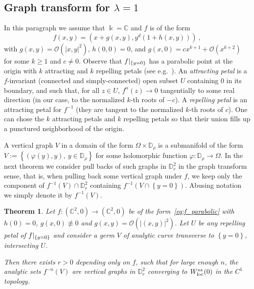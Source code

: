 \documentclass[11 pt, oneside, a4paper]{amsart}
\newcommand{\C}{\mathbb{C}}
\newcommand{\D}{\mathbb{D}}
\newcommand{\loc}{\mathrm{loc}}
\newcommand{\set}[1]{{\left\{#1\right\}}}
\newcommand{\nk}{\Bbbk}
\newcommand{\rest}[1]{ \arrowvert_{#1}}
\newcommand{\inv}{^{-1}}
\newtheorem{thm}{Theorem}[section]
\theoremstyle{definition}
\theoremstyle{definition}
\begin{document}
\subsection{Graph transform   for $\lambda=1$}
In this paragraph we assume that $\nk = \C$ and $f$ is of the form 
\begin{equation}\label{eq:f_parabolic} 
f(x,y) =  \left(x + g(x,y) , y^d(1+h(x,y))\right)~,
\end{equation}
with $g(x,y) = \mathcal{O}(|x,y|^2)$, $h(0,0) = 0$, and $g(x,0) = c x^{k+1} + \mathcal{O}(x^{k+2})$
 for some $k\geq 1$ and $c\neq 0$. Observe that $f\rest{\set{y=0}}$ has a parabolic point at the origin with $k$ attracting and $k$ repelling petals  (see e.g.~\cite[\S 6.5]{beardon:iterratfunction}).
An \emph{attracting petal} is a $f$-invariant (connected and simply-connected) open subset $U$ containing $0$ in its boundary, and such that, for all $z \in U$, $f^n(z) \to 0$
tangentially to some real direction (in our case, to the normalized $k$-th roots of $-c$). A \emph{repelling petal} is an attracting petal for $f^{-1}$ (they are tangent to the normalized $k$-th roots of $c$). One can chose the $k$ attracting petals and $k$ repelling petals so that their union fills up a punctured neighborhood of the origin. 
 

A vertical graph $V$ in a domain of the form $\Omega\times \D_\rho$
 is a  
 submanifold of the 
form $V:= \set{(\varphi(y), y), \ y\in  \D_\rho}$ for some holomorphic function 
$\varphi : \D_\rho \to \Omega$.
In the next theorem we consider 
pull backs of such graphs in $\D_r^2$ in 
 the graph transform sense, that is, 
when pulling back some vertical graph under $f$, we keep only the component of $f\inv (V)\cap \D_r^2$
containing $f\inv(V\cap \set{y=0})$. Abusing notation we simply denote it by $f\inv (V)$. 

\begin{thm}\label{thm:graph_transform_parabolic} 
Let $f\colon(\C^2, 0) \to (\C^2, 0)$ 
  be of the form~\eqref{eq:f_parabolic} 
  with $h(0)=0$, $g(x,0)\not\equiv 0$ and $g(x,y) = \mathcal{O}(|(x,y)|^2)$. 
Let $U$ be any repelling petal of   
$f\rest{\set{y=0}}$ and consider a germ $V$ of analytic curve transverse 
to $\set{y=0}$, intersecting $U$.
 
Then there exists $r>0$  depending only on $f$, such that  for  large enough $n$, 
the analytic sets $f^{-n}(V)$ are   vertical graphs in $\D_r^2$  
converging  to $W^{\rm ss}_\loc(0)$ in the $C^1$ topology. \end{thm}
\end{document}
